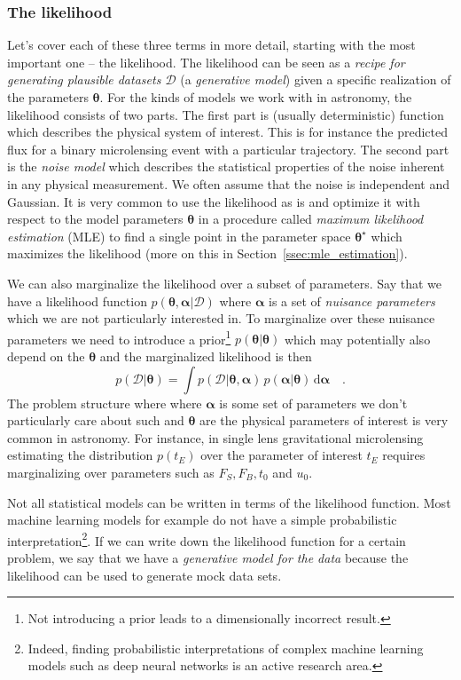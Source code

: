 \documentclass[12pt,dvipsnames]{report}
\newcommand{\ud}{\,\mathrm{d}}
\renewcommand{\vec}[1]{\boldsymbol{\mathbf{#1}}}
\begin{document}
\subsubsection{The likelihood}
Let's cover each of these three terms in more detail, starting with the most
important one -- the likelihood. The likelihood can be seen as a \emph{recipe
    for generating plausible datasets $\mathcal{D}$} (a \emph{generative model})
given a specific realization of the parameters $\vec{\theta}$. For the kinds of
models we work with in astronomy, the likelihood consists of two parts. The
first part is (usually deterministic) function which describes the physical
system of interest. This is for instance the predicted flux for a binary
microlensing event with a particular trajectory. The second part is the
\emph{noise model} which describes the statistical properties of the noise
inherent in any physical measurement. We often assume that the noise is
independent and Gaussian. It is very common to use the likelihood as is and
optimize it with respect to the model parameters $\vec{\theta}$ in a procedure
called \emph{maximum likelihood estimation} (MLE) to find a single point in the
parameter space $\vec{\theta}^\star$ which maximizes the likelihood (more on
this in Section~\ref{ssec:mle_estimation}).

We can also marginalize the likelihood over a subset of parameters. Say that we
have a likelihood function $p(\vec{\theta} ,\vec{\alpha}|\mathcal{D})$ where
$\vec{\alpha}$ is a set of \emph{nuisance parameters} which we are not
particularly interested in. To marginalize over these nuisance parameters we
need to introduce a prior\footnote{Not introducing a prior leads to a
    dimensionally incorrect result.} $p(\vec{\theta}|\vec{\theta})$ which may
potentially also depend on the $\vec{\theta}$ and the marginalized likelihood
is then
\begin{equation}
    p(\mathcal{D} | \vec{\theta})=\int p(\mathcal{D} | \vec{\theta}, \vec{\alpha})\,p(\vec{\alpha} |\vec{\theta}) \ud \vec{\alpha}\quad .
\end{equation}
The problem structure where where $\vec{\alpha}$ is some set of parameters
we don't particularly care about such and $\vec{\theta}$ are the physical
parameters of interest is very common in astronomy. For instance, in single lens gravitational microlensing estimating
the distribution $p(t_E)$ over the parameter of interest $t_E$ requires marginalizing over
parameters such as $F_S, F_B, t_0$ and $u_0$.

Not all statistical models can be written in terms of the likelihood function.
Most machine learning models for example do not have a simple probabilistic
interpretation\footnote{Indeed, finding probabilistic interpretations of
    complex machine learning models such as deep neural networks is an active
    research area.}. If we can write down the likelihood function for a certain
problem, we say that we have a \emph{generative model for the data} because the
likelihood can be used to generate mock data sets.
\end{document}
